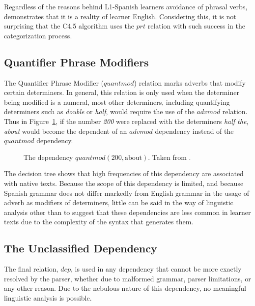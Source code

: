 \documentclass[main.tex]{subfiles}
\begin{document}
Regardless of the reasons behind L1-Spanish learners avoidance of phrasal verbs, \citet{gonzalez:2010} demonstrates that it is a reality of learner English. Considering this, it is not surprising that the C4.5 algorithm uses the $prt$ relation with such success in the categorization process.

\subsection{Quantifier Phrase Modifiers}

The Quantifier Phrase Modifier ($quantmod$) relation marks adverbs that modify certain determiners. In general, this relation is only used when the determiner being modified is a numeral, most other determiners, including quantifying determiners such as \textit{double} or \textit{half}, would require the use of the $advmod$ relation. Thus in Figure~\ref{ex:quantmod}, if the number \textit{200} were replaced with the determiners \textit{half the}, \textit{about} would become the dependent of an $advmod$ dependency instead of the $quantmod$ dependency.

\begin{figure}[h]
\centering
{}
\caption{The dependency $quantmod(\text{200},\text{about})$. Taken from \citet{typed-deps-manual}.}
\label{ex:quantmod}
\end{figure}

The decision tree shows that high frequencies of this dependency are associated with native texts. Because the scope of this dependency is limited, and because Spanish grammar does not differ markedly from English grammar in the usage of adverb as modifiers of determiners, little can be said in the way of linguistic analysis other than to suggest that these dependencies are less common in learner texts due to the complexity of the syntax that generates them.

\subsection{The Unclassified Dependency}

The final relation, $dep$, is used in any dependency that cannot be more exactly resolved by the parser, whether due to malformed grammar, parser limitations, or any other reason. Due to the nebulous nature of this dependency, no meaningful linguistic analysis is possible. 
\end{document}

